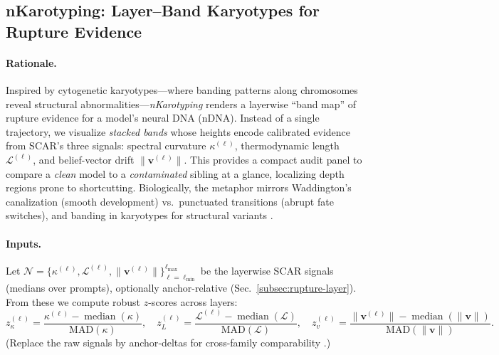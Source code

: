 \documentclass[11pt]{article}
\begin{document}
\vspace{0.5em}
\subsection{nKarotyping: Layer--Band Karyotypes for Rupture Evidence}
\label{subsec:nkaryotype}

\paragraph{Rationale.}
Inspired by cytogenetic karyotypes---where banding patterns along chromosomes reveal structural abnormalities---\emph{nKarotyping} renders a layerwise ``band map'' of rupture evidence for a model’s neural DNA (nDNA).
Instead of a single trajectory, we visualize \emph{stacked bands} whose heights encode calibrated evidence from SCAR’s three signals: spectral curvature $\kappa^{(\ell)}$, thermodynamic length $\mathcal{L}^{(\ell)}$, and belief-vector drift $\|\mathbf{v}^{(\ell)}\|$.
This provides a compact audit panel to compare a \emph{clean} model to a \emph{contaminated} sibling at a glance, localizing depth regions prone to shortcutting.
Biologically, the metaphor mirrors Waddington’s canalization (smooth development) vs.\ punctuated transitions (abrupt fate switches), and banding in karyotypes for structural variants \citep{waddington1957strategy,alon2006systems}.

\paragraph{Inputs.}
Let $\mathcal{N}=\{\kappa^{(\ell)},\mathcal{L}^{(\ell)},\|\mathbf{v}^{(\ell)}\|\}_{\ell=\ell_{\min}}^{\ell_{\max}}$ be the layerwise SCAR signals (medians over prompts), optionally anchor-relative (Sec.~\ref{subsec:rupture-layer}).
From these we compute robust $z$-scores across layers:
\[
z_\kappa^{(\ell)}=\frac{\kappa^{(\ell)}-\operatorname{median}(\kappa)}{\mathrm{MAD}(\kappa)},\quad
z_L^{(\ell)}=\frac{\mathcal{L}^{(\ell)}-\operatorname{median}(\mathcal{L})}{\mathrm{MAD}(\mathcal{L})},\quad
z_v^{(\ell)}=\frac{\|\mathbf{v}^{(\ell)}\|-\operatorname{median}(\|\mathbf{v}\|)}{\mathrm{MAD}(\|\mathbf{v}\|)}.
\]
(Replace the raw signals by anchor‐deltas for cross-family comparability \citep{kornblith2019cka,raghu2017svcca}.)
\end{document}
